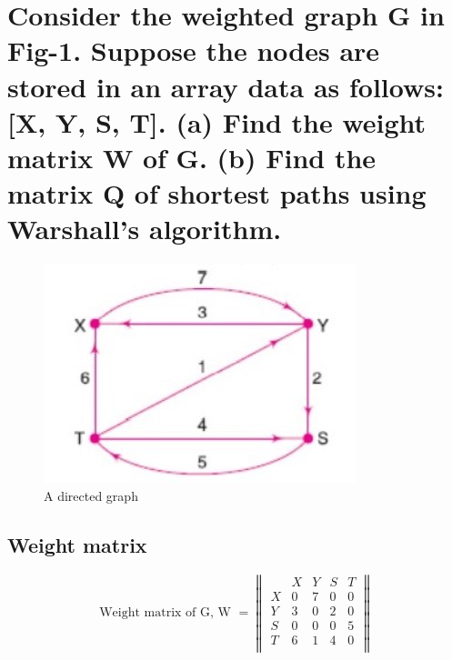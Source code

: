 \documentclass[11 pt]{article}
\begin{document}
\pagebreak

\section{Consider the weighted graph G in Fig-1. Suppose the nodes are stored in an array data as follows: [X, Y, S, T]. (a) Find the weight matrix W of G. (b) Find the matrix Q of shortest paths using Warshall's algorithm.}
\begin{figure}[hbtp]
\centering
\includegraphics[scale=0.5]{Pictures/Screenshot_2.jpg}
\caption{A directed graph}
\end{figure}

\subsection{Weight matrix}
$$
\textrm{Weight matrix of G, W }=
\begin{Vmatrix}
	  & X & Y & S & T\\
	X & 0 & 7 & 0 & 0 \\
	Y & 3 & 0 & 2 & 0 \\
	S & 0 & 0 & 0 & 5 \\
	T & 6 & 1 & 4 & 0 \\
\end{Vmatrix}
$$
	
\end{document}
